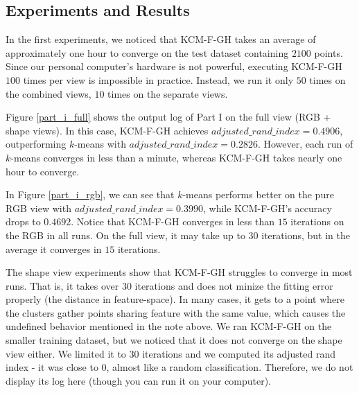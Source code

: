 \documentclass[conference]{IEEEtran}
\begin{document}
\subsection{Experiments and Results}

In the first experiments, we noticed that KCM-F-GH takes an average of approximately one hour to converge on the test dataset containing $2100$ points.
Since our personal computer's hardware is not powerful, executing KCM-F-GH $100$ times per view is impossible in practice.
Instead, we run it only $50$ times on the combined views, $10$ times on the separate views.

Figure \ref{part_i_full} shows the output log of Part I on the full view (RGB + shape views).
In this case, KCM-F-GH achieves $adjusted\_rand\_index = 0.4906$, outperforming $k$-means with $adjusted\_rand\_index = 0.2826$.
However, each run of $k$-means converges in less than a minute, whereas KCM-F-GH takes nearly one hour to converge.

In Figure \ref{part_i_rgb}, we can see that $k$-means performs better on the pure RGB view with $adjusted\_rand\_index = 0.3990$, while KCM-F-GH's accuracy drops to $0.4692$.
Notice that KCM-F-GH converges in less than $15$ iterations on the RGB in all runs.
On the full view, it may take up to $30$ iterations, but in the average it converges in $15$ iterations.

The shape view experiments show that KCM-F-GH struggles to converge in most runs.
That is, it takes over $30$ iterations and does not minize the fitting error properly (the distance in feature-space).
In many cases, it gets to a point where the clusters gather points sharing feature with the same value, which causes the undefined behavior mentioned in the note above.
We ran KCM-F-GH on the smaller training dataset, but we noticed that it does not converge on the shape view either.
We limited it to $30$ iterations and we computed its adjusted rand index - it was close to $0$, almost like a random classification.
Therefore, we do not display its log here (though you can run it on your computer).
\end{document}

